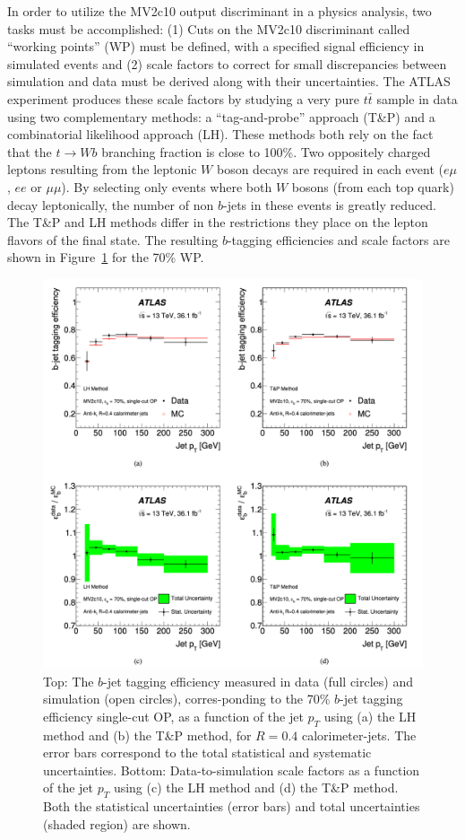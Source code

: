 In order to utilize the MV2c10 output discriminant in a physics analysis, two tasks must be accomplished: (1) Cuts on the MV2c10 discriminant called ``working points'' (WP) must be defined, with a specified signal efficiency in simulated events and (2) scale factors to correct for small discrepancies between simulation and data must be derived along with their uncertainties.
The ATLAS experiment produces these scale factors by studying a very pure $t\bar{t}$ sample in data using two complementary methods: a ``tag-and-probe'' approach (T\&P) and a combinatorial likelihood approach (LH).
These methods both rely on the fact that the $t \rightarrow Wb$ branching fraction is close to 100\%.
Two oppositely charged leptons resulting from the leptonic $W$ boson decays are required in each event ($e\mu$, $ee$ or $\mu\mu$).
By selecting only events where both $W$ bosons (from each top quark) decay leptonically, the number of non $b$-jets in these events is greatly reduced. The T\&P and LH methods differ in the restrictions they place on the lepton flavors of the final state. The resulting $b$-tagging efficiencies and scale factors are shown in Figure~\ref{fig:b_tagging_eff_sf} for the 70\% WP.

\begin{figure}
	\centering
	\includegraphics[width=\textwidth]{b_tagging_eff_sf}
	\caption{
	Top: The $b$-jet tagging efficiency measured in data (full circles) and simulation (open circles), corres-ponding to the 70\% $b$-jet tagging efficiency single-cut OP, as a function of the jet $p_T$ using (a) the LH method and (b) the T\&P method, for $R = 0.4$ calorimeter-jets. The error bars correspond to the total statistical and systematic uncertainties. Bottom: Data-to-simulation scale factors as a function of the jet $p_T$ using (c) the LH method and (d) the T\&P method. Both the statistical uncertainties (error bars) and total uncertainties (shaded region) are shown.
    \cite{Aaboud:2018xwy}
	}
	\label{fig:b_tagging_eff_sf}
\end{figure}

